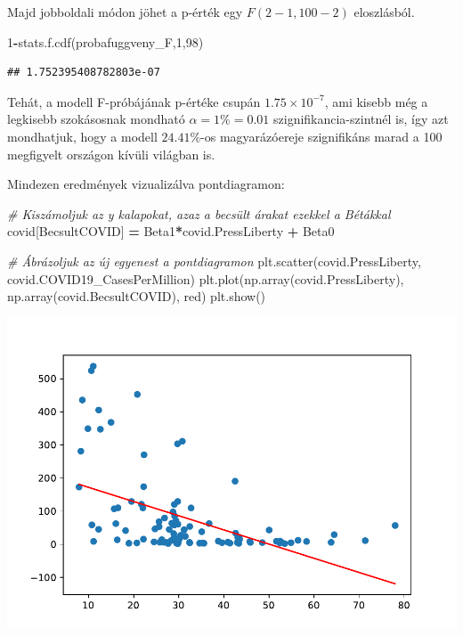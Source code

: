 \documentclass[
]{book}
\newenvironment{Shaded}{\begin{snugshade}}{\end{snugshade}}
\newcommand{\CommentTok}[1]{\textcolor[rgb]{0.56,0.35,0.01}{\textit{#1}}}
\newcommand{\DecValTok}[1]{\textcolor[rgb]{0.00,0.00,0.81}{#1}}
\newcommand{\NormalTok}[1]{#1}
\newcommand{\OperatorTok}[1]{\textcolor[rgb]{0.81,0.36,0.00}{\textbf{#1}}}
\newcommand{\StringTok}[1]{\textcolor[rgb]{0.31,0.60,0.02}{#1}}
\begin{document}
Majd jobboldali módon jöhet a p-érték egy \(F(2-1,100-2)\) eloszlásból.

\begin{Shaded}
\begin{Highlighting}[]
\DecValTok{1}\OperatorTok{{-}}\NormalTok{stats.f.cdf(probafuggveny\_F,}\DecValTok{1}\NormalTok{,}\DecValTok{98}\NormalTok{)}
\end{Highlighting}
\end{Shaded}

\begin{verbatim}
## 1.752395408782803e-07
\end{verbatim}

Tehát, a modell F-próbájának p-értéke csupán \(1.75 \times 10^{-7}\), ami kisebb még a legkisebb szokásosnak mondható \(\alpha=1\%=0.01\) szignifikancia-szintnél is, így azt mondhatjuk, hogy a modell \(24.41\%\)-os magyarázóereje szignifikáns marad a 100 megfigyelt országon kívüli világban is.

Mindezen eredmények vizualizálva pontdiagramon:

\begin{Shaded}
\begin{Highlighting}[]
\CommentTok{\# Kiszámoljuk az y kalapokat, azaz a becsült árakat ezekkel a Bétákkal}
\NormalTok{covid[}\StringTok{\textquotesingle{}BecsultCOVID\textquotesingle{}}\NormalTok{] }\OperatorTok{=}\NormalTok{ Beta1}\OperatorTok{*}\NormalTok{covid.PressLiberty }\OperatorTok{+}\NormalTok{ Beta0}

\CommentTok{\# Ábrázoljuk az új egyenest a pontdiagramon}
\NormalTok{plt.scatter(covid.PressLiberty, covid.COVID19\_CasesPerMillion)}
\NormalTok{plt.plot(np.array(covid.PressLiberty),}
\NormalTok{         np.array(covid.BecsultCOVID), }\StringTok{\textquotesingle{}red\textquotesingle{}}\NormalTok{)}
\NormalTok{plt.show()}
\end{Highlighting}
\end{Shaded}

\includegraphics{_main_files/figure-latex/unnamed-chunk-401-45.pdf}
\end{document}
